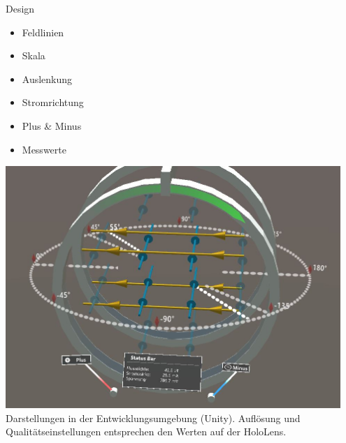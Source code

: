 \begin{frame}[fragile]{Design}
	\vspace{-10px}
	\begin{minipage}{0.25\textwidth}
		{
			\begin{itemize}[itemsep=1mm]
				\item Feldlinien
				\item Skala
				\item Auslenkung
				\item Stromrichtung
				\item Plus \& Minus
				\item Messwerte
			\end{itemize}
		}
	\end{minipage}
	\begin{minipage}{0.7\textwidth}
		\centering
		\includegraphics[width=0.95\textwidth]{images/unity/overview.jpg}\\
		\scriptsize Darstellungen in der Entwicklungsumgebung (Unity). Auflösung und Qualitätseinstellungen entsprechen den Werten auf der HoloLens.
	\end{minipage}
\end{frame}

